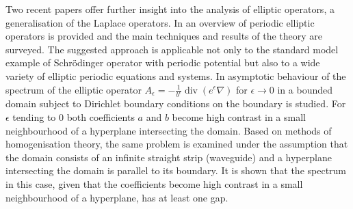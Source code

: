 Two recent papers offer further insight into the analysis of elliptic operators, a generalisation of the Laplace operators. In \cite{kuchment2016overview} an overview of periodic elliptic operators is provided and the main techniques and results of the theory are surveyed. The suggested approach is applicable not only to the standard model example of Schrödinger operator with periodic potential but also to a wide variety of elliptic periodic equations and systems. In \cite{khrabustovskyi2016spectral} asymptotic behaviour of the spectrum of the elliptic operator $A_{\epsilon} = - \frac{1}{b^{\epsilon}} \operatorname{div}(e^{\epsilon} \nabla)$ for $\epsilon \rightarrow 0$ in a bounded domain subject to Dirichlet boundary conditions on the boundary is studied. For $\epsilon$ tending to $0$ both coefficients $a$ and $b$ become high contrast in a small neighbourhood of a hyperplane intersecting the domain. Based on methods of homogenisation theory, the same problem is examined under the assumption that the domain consists of an infinite straight strip (waveguide) and a hyperplane intersecting the domain is parallel to its boundary. It is shown that the spectrum in this case, given that the coefficients become high contrast in a small neighbourhood of a hyperplane, has at least one gap.
